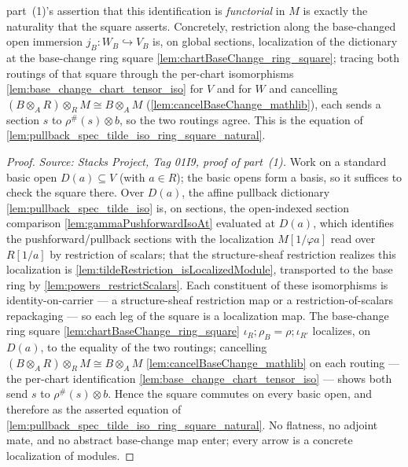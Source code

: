 \begin{lemma}
  part~(1)'s assertion that this identification is \emph{functorial} in \(M\) is exactly the naturality
  that the square asserts. Concretely, restriction along the base-changed open immersion
  \(j_B : W_B \hookrightarrow V_B\) is, on global sections, localization of the dictionary at the
  base-change ring square \cref{lem:chartBaseChange_ring_square}; tracing both routings of that square
  through the per-chart isomorphisms \cref{lem:base_change_chart_tensor_iso} for \(V\) and for \(W\) and
  cancelling \((B \otimes_A R) \otimes_R M \cong B \otimes_A M\)
  (\cref{lem:cancelBaseChange_mathlib}), each sends a section \(s\) to \(\rho^{\#}(s) \otimes b\), so the
  two routings agree. This is the equation of
  \cref{lem:pullback_spec_tilde_iso_ring_square_natural}.
  \begin{proof}
    \textit{Source: Stacks Project, Tag 01I9, proof of part~(1).}
    Work on a standard basic open \(D(a) \subseteq V\) (with \(a \in R\)); the basic opens form a basis,
    so it suffices to check the square there. Over \(D(a)\), the affine pullback dictionary
    \cref{lem:pullback_spec_tilde_iso} is, on sections, the open-indexed section comparison
    \cref{lem:gammaPushforwardIsoAt} evaluated at \(D(a)\), which identifies the pushforward/pullback
    sections with the localization \(M[1/\varphi a]\) read over \(R[1/a]\) by restriction of scalars; that
    the structure-sheaf restriction realizes this localization is
    \cref{lem:tildeRestriction_isLocalizedModule}, transported to the base ring by
    \cref{lem:powers_restrictScalars}. Each constituent of these isomorphisms is identity-on-carrier — a
    structure-sheaf restriction map or a restriction-of-scalars repackaging — so each leg of the square is
    a localization map. The base-change ring square \cref{lem:chartBaseChange_ring_square}
    \(\iota_R \mathbin{;} \rho_B = \rho \mathbin{;} \iota_{R'}\) localizes, on \(D(a)\), to the equality of
    the two routings; cancelling \((B \otimes_A R) \otimes_R M \cong B \otimes_A M\)
    \cref{lem:cancelBaseChange_mathlib} on each routing — the per-chart identification
    \cref{lem:base_change_chart_tensor_iso} — shows both send \(s\) to \(\rho^{\#}(s) \otimes b\). Hence the
    square commutes on every basic open, and therefore as the asserted equation of
    \cref{lem:pullback_spec_tilde_iso_ring_square_natural}. No flatness, no adjoint mate, and no abstract
    base-change map enter; every arrow is a concrete localization of modules.


\end{proof}
\end{lemma}
